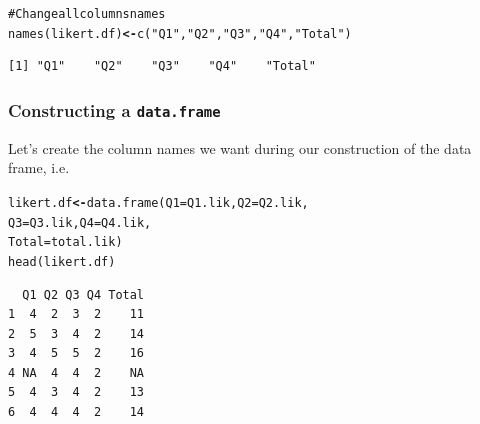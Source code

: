 \documentclass{beamer}\usepackage[]{graphicx}\usepackage[]{color}
\makeatletter
\newcommand{\hlstr}[1]{\textcolor[rgb]{0.667,0.267,0}{#1}}%
\newcommand{\hlcom}[1]{\textcolor[rgb]{1,0.533,0}{#1}}%
\newcommand{\hlstd}[1]{\textcolor[rgb]{0,0,0}{#1}}%
\newcommand{\hlkwb}[1]{\textcolor[rgb]{0,0,0.4}{\textbf{#1}}}%
\newcommand{\hlkwc}[1]{\textcolor[rgb]{0,0,0.4}{#1}}%
\newcommand{\hlkwd}[1]{\textcolor[rgb]{0,0.267,0.4}{#1}}%
\newenvironment{kframe}{%
 \def\at@end@of@kframe{}%
 \ifinner\ifhmode%
  \def\at@end@of@kframe{\end{minipage}}%
  \begin{minipage}{\columnwidth}%
 \fi\fi%
 \def\FrameCommand##1{\hskip\@totalleftmargin \hskip-\fboxsep
 \colorbox{shadecolor}{##1}\hskip-\fboxsep
     \hskip-\linewidth \hskip-\@totalleftmargin \hskip\columnwidth}%
 \MakeFramed {\advance\hsize-\width
   \@totalleftmargin\z@ \linewidth\hsize
   \@setminipage}}%
 {\par\unskip\endMakeFramed%
 \at@end@of@kframe}
\newenvironment{knitrout}{}{} %
\makeatother
\begin{document}
\begin{frame}[fragile]
\begin{knitrout}
\begin{kframe}
\begin{alltt}
\hlcom{# Change all columns names}
\hlkwd{names}\hlstd{(likert.df)} \hlkwb{<-} \hlkwd{c}\hlstd{(}\hlstr{"Q1"}\hlstd{,} \hlstr{"Q2"}\hlstd{,} \hlstr{"Q3"}\hlstd{,} \hlstr{"Q4"}\hlstd{,} \hlstr{"Total"}\hlstd{)}
\end{alltt}
\end{kframe}
\end{knitrout}
\vspace{-5mm}
\begin{knitrout}
\color{fgcolor}\begin{kframe}
\begin{verbatim}
[1] "Q1"    "Q2"    "Q3"    "Q4"    "Total"
\end{verbatim}
\end{kframe}
\end{knitrout}
\end{frame}

\begin{frame}[fragile]
\frametitle{Constructing a \texttt{data.frame}}
Let's create the column names we want during our construction of the data frame, i.e.
\begin{knitrout}
\color{fgcolor}\begin{kframe}
\begin{alltt}
\hlstd{likert.df} \hlkwb{<-} \hlkwd{data.frame}\hlstd{(}\hlkwc{Q1}\hlstd{=Q1.lik,} \hlkwc{Q2}\hlstd{=Q2.lik,}
                        \hlkwc{Q3}\hlstd{=Q3.lik,} \hlkwc{Q4}\hlstd{=Q4.lik,}
                        \hlkwc{Total}\hlstd{=total.lik)}
\hlkwd{head}\hlstd{(likert.df)}
\end{alltt}
\begin{verbatim}
  Q1 Q2 Q3 Q4 Total
1  4  2  3  2    11
2  5  3  4  2    14
3  4  5  5  2    16
4 NA  4  4  2    NA
5  4  3  4  2    13
6  4  4  4  2    14
\end{verbatim}
\end{kframe}
\end{knitrout}
\end{frame}
\end{document}
